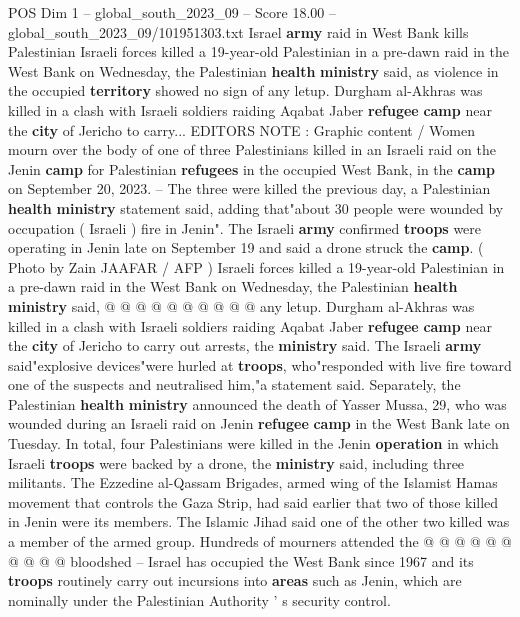 \begin{textsample}{POS Dim 1 – global\_south\_2023\_09 – Score 18.00 – global\_south\_2023\_09/101951303.txt}  \label{ex:f1_pos_441}
Israel \textbf{army} raid in West Bank kills Palestinian Israeli forces killed a 19-year-old Palestinian in a pre-dawn raid in the West Bank on Wednesday, the Palestinian \textbf{health} \textbf{ministry} said, as violence in the occupied \textbf{territory} showed no sign of any letup.
Durgham al-Akhras was killed in a clash with Israeli soldiers raiding Aqabat Jaber \textbf{refugee} \textbf{camp} near the \textbf{city} of Jericho to carry...
EDITORS NOTE : Graphic content / Women mourn over the body of one of three Palestinians killed in an Israeli raid on the Jenin \textbf{camp} for Palestinian \textbf{refugees} in the occupied West Bank, in the \textbf{camp} on September 20, 2023. -- The three were killed the previous day, a Palestinian \textbf{health} \textbf{ministry} statement said, adding that"about 30 people were wounded by occupation ( Israeli ) fire in Jenin".
The Israeli \textbf{army} confirmed \textbf{troops} were operating in Jenin late on September 19 and said a drone struck the \textbf{camp}. ( Photo by Zain JAAFAR / AFP ) Israeli forces killed a 19-year-old Palestinian in a pre-dawn raid in the West Bank on Wednesday, the Palestinian \textbf{health} \textbf{ministry} said, @ @ @ @ @ @ @ @ @ @ any letup.
Durgham al-Akhras was killed in a clash with Israeli soldiers raiding Aqabat Jaber \textbf{refugee} \textbf{camp} near the \textbf{city} of Jericho to carry out arrests, the \textbf{ministry} said.
The Israeli \textbf{army} said"explosive devices"were hurled at \textbf{troops}, who"responded with live fire toward one of the suspects and neutralised him,"a statement said.
Separately, the Palestinian \textbf{health} \textbf{ministry} announced the death of Yasser Mussa, 29, who was wounded during an Israeli raid on Jenin \textbf{refugee} \textbf{camp} in the West Bank late on Tuesday.
In total, four Palestinians were killed in the Jenin \textbf{operation} in which Israeli \textbf{troops} were backed by a drone, the \textbf{ministry} said, including three militants.
The Ezzedine al-Qassam Brigades, armed wing of the Islamist Hamas movement that controls the Gaza Strip, had said earlier that two of those killed in Jenin were its members.
The Islamic Jihad said one of the other two killed was a member of the armed group.
Hundreds of mourners attended the @ @ @ @ @ @ @ @ @ @ bloodshed -- Israel has occupied the West Bank since 1967 and its \textbf{troops} routinely carry out incursions into \textbf{areas} such as Jenin, which are nominally under the Palestinian Authority ' s security control.

\end{textsample}
